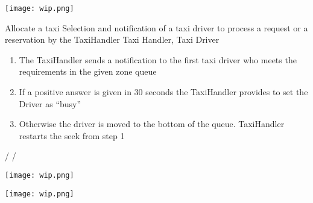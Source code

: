 \pagebreak
\texttt{[image: wip.png]}

\usecase
{Allocate a taxi}
{Selection and notification of a taxi driver to process a request or a reservation by the TaxiHandler}
{Taxi Handler, Taxi Driver}
{
\begin{enumerate}
	\item The TaxiHandler sends a notification to the first taxi driver who meets the requirements in the given zone queue
	\item If a positive answer is given in 30 seconds the TaxiHandler provides to set the Driver as ``busy''
	\item Otherwise the driver is moved to the bottom of the queue. TaxiHandler restarts the seek from step 1
\end{enumerate}
}
{
/
}
{ 
/
}

\pagebreak
\texttt{[image: wip.png]}

\pagebreak
\texttt{[image: wip.png]}
